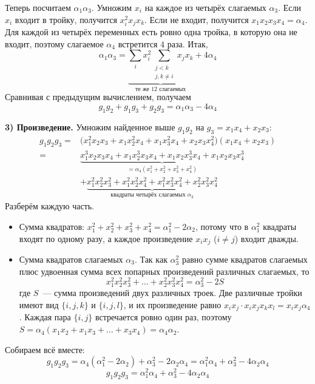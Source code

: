 \documentclass[12pt]{article}
\begin{document}
	Теперь посчитаем $\alpha_1\alpha_3$. Умножим $x_i$ на каждое из четырёх слагаемых $\alpha_3$. Если $x_i$ входит в тройку, получится $x_i^2x_jx_k$. Если не входит, получится $x_1x_2x_3x_4 = \alpha_4$. Для каждой из четырёх переменных есть ровно одна тройка, в которую она не входит, поэтому слагаемое $\alpha_4$ встретится $4$ раза. Итак,
	\[
		\alpha_1\alpha_3 = \underbrace{\sum_{i} x_i^2 \sum_{\substack{j < k \\ j, k \neq i}} x_jx_k}_{\text{те же 12 слагаемых}} + 4\alpha_4
	\]
	Сравнивая с предыдущим вычислением, получаем
	\[
		\boxed{g_1g_2 + g_1g_3 + g_2g_3 = \alpha_1\alpha_3 - 4\alpha_4}
	\]

	\medskip
	\noindent
	\textbf{3) Произведение.} Умножим найденное выше $g_1g_2$ на $g_3 = x_1x_4 + x_2x_3$:
	\begin{align*}
		g_1g_2g_3 = {}& \bigl(x_1^2x_2x_3 + x_1x_2^2x_4 + x_1x_3^2x_4 + x_2x_3x_4^2\bigr)(x_1x_4 + x_2x_3) \\
		= {}& \underbrace{x_1^3x_2x_3x_4 + x_1x_2^3x_3x_4 + x_1x_2x_3^3x_4 + x_1x_2x_3x_4^3}_{= \alpha_4 (x_1^2 + x_2^2 + x_3^2 + x_4^2)} \\
		&+ \underbrace{x_1^2x_2^2x_3^2 + x_1^2x_2^2x_4^2 + x_1^2x_3^2x_4^2 + x_2^2x_3^2x_4^2}_{\text{квадраты четырёх слагаемых } \alpha_3}
	\end{align*}
	Разберём каждую часть.

	\begin{itemize}
		\item Сумма квадратов: $x_1^2 + x_2^2 + x_3^2 + x_4^2 = \alpha_1^2 - 2\alpha_2$, потому что в $\alpha_1^2$ квадраты входят по одному разу, а каждое произведение $x_ix_j$ ($i \neq j$) входит дважды.
		\item Сумма квадратов слагаемых $\alpha_3$. Так как $\alpha_3^2$ равно сумме квадратов слагаемых плюс удвоенная сумма всех попарных произведений различных слагаемых, то
		\[
			x_1^2x_2^2x_3^2 + \dots + x_2^2x_3^2x_4^2 = \alpha_3^2 - 2S
		\]
		где $S$~--- сумма произведений двух различных троек. Две различные тройки имеют вид $\{i, j, k\}$ и $\{i, j, l\}$, и их произведение равно $x_ix_j \cdot x_ix_jx_kx_l = x_ix_j\alpha_4$. Каждая пара $\{i, j\}$ встречается ровно один раз, поэтому $S = \alpha_4(x_1x_2 + x_1x_3 + \dots + x_3x_4) = \alpha_4\alpha_2$.
	\end{itemize}
	Собираем всё вместе:
	\[
		g_1g_2g_3 = \alpha_4(\alpha_1^2 - 2\alpha_2) + \alpha_3^2 - 2\alpha_2\alpha_4 = \alpha_1^2\alpha_4 + \alpha_3^2 - 4\alpha_2\alpha_4
	\]
	\[
		\boxed{g_1g_2g_3 = \alpha_1^2\alpha_4 + \alpha_3^2 - 4\alpha_2\alpha_4}
	\]
\end{document}
